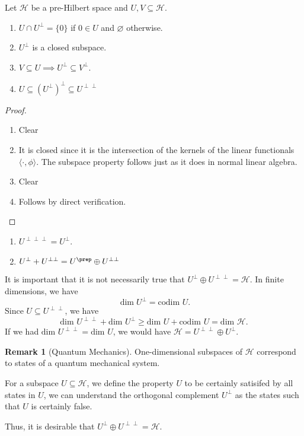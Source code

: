 \documentclass[prb,12pt]{revtex4-2}
\theoremstyle{definition}
\newtheorem{Remark}[Theorem]{Remark}
\theoremstyle{definition}
\theoremstyle{definition}
\newenvironment{parts}{\begin{enumerate}[label=(\alph*)]}{\end{enumerate}}
\begin{document}
\begin{Theorem}
	Let $\mathcal{H}$ be a pre-Hilbert space and $U,V\subseteq \mathcal{H}$. 
	\begin{parts}
	\item $U \cap U^\perp= \{0\} $ if $0\in U$ and $\varnothing$ otherwise.
	\item $U^\perp$ is a closed subspace.
	\item $V\subseteq U \implies U^\perp \subseteq V^\perp$.
	\item $U\subseteq (U^\perp)^\perp\subseteq U^{\perp\perp}$
	\end{parts}
\end{Theorem}
\begin{proof}
	\begin{parts}
	\item Clear
	\item It is closed since it is the intersection of the kernels of the linear functionals $\langle \cdot, \phi\rangle$. The subspace property follows just as it does in normal linear algebra. 
	\item Clear
	\item Follows by direct verification.
	\end{parts}
\end{proof}
\begin{Corollary}
	\begin{parts}
	\item $U^{\perp\perp\perp} = U^\perp$.
	\item $U^\perp + U^{\perp\perp} = U^\prep \oplus U^{\perp\perp}$
	\end{parts}
\end{Corollary}
It is important that it is not necessarily true that $U^\perp\oplus U^{\perp\perp}=\mathcal{H}$. In finite dimensions, we have
\[
	\dim U^\perp = \text{codim }U
.\] 
Since $U\subseteq U^{\perp\perp}$, we have
\[
	\text{dim }U^{\perp\perp} + \text{dim }U^\perp \ge \text{dim }U + \text{codim }U = \text{dim }\mathcal{H}
.\] 
If we had $\text{dim }U^{\perp\perp}= \text{dim }U$, we would have $\mathcal{H}=U^{\perp\perp}\oplus U^\perp$.
\begin{Remark}[Quantum Mechanics]
	One-dimensional subspaces of $\mathcal{H}$ correspond to states of a quantum mechanical system.

	For a subspace $U\subseteq \mathcal{H}$, we define the property $U$ to be certainly satisifed by all states in $U$, we can understand the orthogonal complement $U^\perp$ as the states such that $U$ is certainly false.

	Thus, it is desirable that $U^\perp \oplus U^{\perp\perp}=\mathcal{H}$.
\end{Remark}
\end{document}
